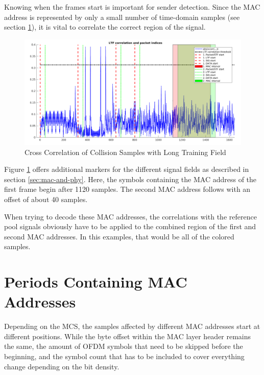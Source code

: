 Knowing when the frames start is important for sender detection. Since the \gls{MAC} address is represented by only a small number of time-domain samples (see section \ref{sec:mac-periods}), it is vital to correlate the correct region of the signal.

\begin{figure}[H]
	\centering
	\includegraphics[width=\textwidth]{gfx/plots/preamble}
	\caption{Cross Correlation of Collision Samples with Long Training Field}
	\label{fig:preamble-corr}
\end{figure}

Figure \ref{fig:preamble-corr} offers additional markers for the different signal fields as described in section \ref{sec:mac-and-phy}. Here, the symbols containing the \gls{MAC} address of the first frame begin after 1120 samples. The second \gls{MAC} address follows with an offset of about 40 samples.

When trying to decode these \gls{MAC} addresses, the correlations with the reference pool signals obviously have to be applied to the combined region of the first and second \gls{MAC} addresses. In this examples, that would be all of the colored samples.



\section{Periods Containing MAC Addresses}\label{sec:mac-periods}

Depending on the \gls{MCS}, the samples affected by different \gls{MAC} addresses start at different positions. While the byte offset within the \gls{MAC} layer header remains the same, the amount of \gls{OFDM} symbols that need to be skipped before the beginning, and the symbol count that has to be included to cover everything change depending on the bit density.


